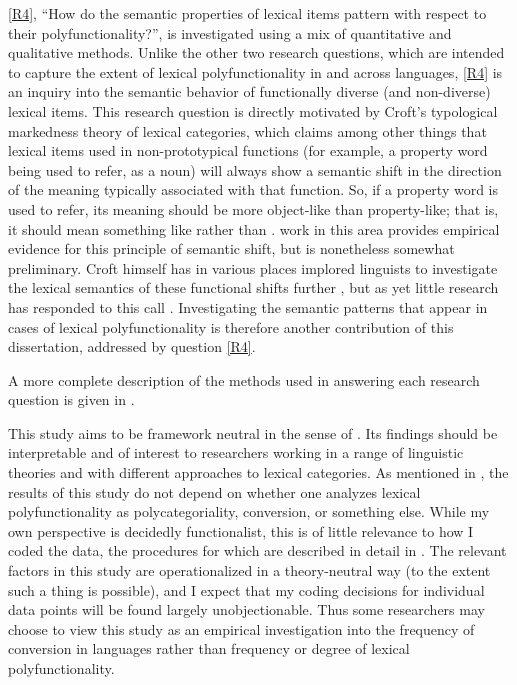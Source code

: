 \ref{R4}, \enquote{How do the semantic properties of lexical items pattern with respect to their polyfunctionality?}, is investigated using a mix of quantitative and qualitative methods. Unlike the other two research questions, which are intended to capture the extent of lexical polyfunctionality in and across languages, \ref{R4} is an inquiry into the semantic behavior of functionally diverse (and non-diverse) lexical items. This research question is directly motivated by Croft's \parencites*{Croft1991}{Croft2000}{Croft2001b}{Croftfc} typological markedness theory of lexical categories, which claims among other things that lexical items used in non-prototypical functions (for example, a property word being used to refer, as a noun) will always show a semantic shift in the direction of the meaning typically associated with that function. So, if a property word is used to refer, its meaning should be more object-like than property-like; that is, it should mean something like  rather than .  work in this area provides empirical evidence for this principle of semantic shift, but is nonetheless somewhat preliminary. Croft himself has in various places implored linguists to investigate the lexical semantics of these functional shifts further \parencites[440]{Croft2005}[70]{CroftLier2012}, but as yet little research has responded to this call . Investigating the semantic patterns that appear in cases of lexical polyfunctionality is therefore another contribution of this dissertation, addressed by question \ref{R4}.

A more complete description of the methods used in answering each research question is given in .

This study aims to be framework neutral in the sense of \textcite{Haspelmath2010b}. Its findings should be interpretable and of interest to researchers working in a range of linguistic theories and with different approaches to lexical categories. As mentioned in , the results of this study do not depend on whether one analyzes lexical polyfunctionality as polycategoriality, conversion, or something else. While my own perspective is decidedly functionalist, this is of little relevance to how I coded the data, the procedures for which are described in detail in . The relevant factors in this study are operationalized in a theory-neutral way (to the extent such a thing is possible), and I expect that my coding decisions for individual data points will be found largely unobjectionable. Thus some researchers may choose to view this study as an empirical investigation into the frequency of conversion in languages rather than frequency or degree of lexical polyfunctionality.

